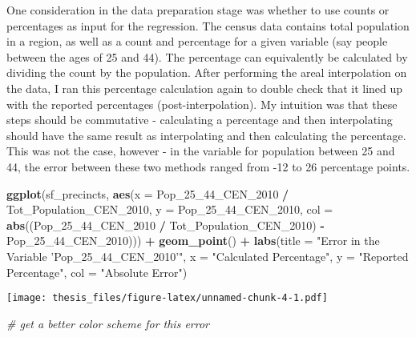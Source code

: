\documentclass[12pt,twoside]{reedthesis}
\newenvironment{Shaded}{\begin{snugshade}}{\end{snugshade}}
\newcommand{\CommentTok}[1]{\textcolor[rgb]{0.56,0.35,0.01}{\textit{#1}}}
\newcommand{\DataTypeTok}[1]{\textcolor[rgb]{0.13,0.29,0.53}{#1}}
\newcommand{\DecValTok}[1]{\textcolor[rgb]{0.00,0.00,0.81}{#1}}
\newcommand{\KeywordTok}[1]{\textcolor[rgb]{0.13,0.29,0.53}{\textbf{#1}}}
\newcommand{\NormalTok}[1]{#1}
\newcommand{\OperatorTok}[1]{\textcolor[rgb]{0.81,0.36,0.00}{\textbf{#1}}}
\newcommand{\StringTok}[1]{\textcolor[rgb]{0.31,0.60,0.02}{#1}}
\theoremstyle{definition}
\theoremstyle{definition}
\theoremstyle{definition}
\theoremstyle{remark}
\begin{document}
One consideration in the data preparation stage was whether to use
counts or percentages as input for the regression. The census data
contains total population in a region, as well as a count and percentage
for a given variable (say people between the ages of 25 and 44). The
percentage can equivalently be calculated by dividing the count by the
population. After performing the areal interpolation on the data, I ran
this percentage calculation again to double check that it lined up with
the reported percentages (post-interpolation). My intuition was that
these steps should be commutative - calculating a percentage and then
interpolating should have the same result as interpolating and then
calculating the percentage. This was not the case, however - in the
variable for population between 25 and 44, the error between these two
methods ranged from -12 to 26 percentage points.
\begin{Shaded}
\begin{Highlighting}[]
\KeywordTok{ggplot}\NormalTok{(sf_precincts, }\KeywordTok{aes}\NormalTok{(}\DataTypeTok{x =}\NormalTok{ Pop_}\DecValTok{25}\NormalTok{_}\DecValTok{44}\NormalTok{_CEN_}\DecValTok{2010} \OperatorTok{/}\StringTok{ }\NormalTok{Tot_Population_CEN_}\DecValTok{2010}\NormalTok{,}
                         \DataTypeTok{y =}\NormalTok{ Pop_}\DecValTok{25}\NormalTok{_}\DecValTok{44}\NormalTok{_CEN_}\DecValTok{2010}\NormalTok{,}
                         \DataTypeTok{col =} \KeywordTok{abs}\NormalTok{((Pop_}\DecValTok{25}\NormalTok{_}\DecValTok{44}\NormalTok{_CEN_}\DecValTok{2010} \OperatorTok{/}\StringTok{ }\NormalTok{Tot_Population_CEN_}\DecValTok{2010}\NormalTok{) }\OperatorTok{-}\StringTok{ }\NormalTok{Pop_}\DecValTok{25}\NormalTok{_}\DecValTok{44}\NormalTok{_CEN_}\DecValTok{2010}\NormalTok{))) }\OperatorTok{+}
\StringTok{  }\KeywordTok{geom_point}\NormalTok{() }\OperatorTok{+}
\StringTok{  }\KeywordTok{labs}\NormalTok{(}\DataTypeTok{title =} \StringTok{"Error in the Variable 'Pop_25_44_CEN_2010'"}\NormalTok{,}
       \DataTypeTok{x =} \StringTok{"Calculated Percentage"}\NormalTok{,}
       \DataTypeTok{y =} \StringTok{"Reported Percentage"}\NormalTok{,}
       \DataTypeTok{col =} \StringTok{"Absolute Error"}\NormalTok{)}
\end{Highlighting}
\end{Shaded}
\texttt{[image: thesis\_files/figure-latex/unnamed-chunk-4-1.pdf]}
\begin{Shaded}
\begin{Highlighting}[]
\CommentTok{# get a better color scheme for this error}
\end{Highlighting}
\end{Shaded}
\end{document}

